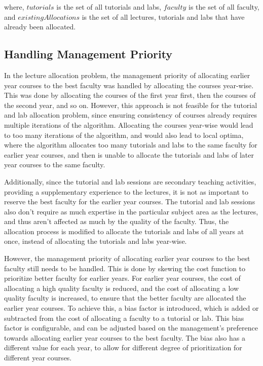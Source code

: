 where, $tutorials$ is the set of all tutorials and labs, $faculty$ is the set of all faculty, and $existingAllocations$ is the set of all lectures, tutorials and labs that have already been allocated.

\subsection{Handling Management Priority}

In the lecture allocation problem, the management priority of allocating earlier year courses to the best faculty was handled by allocating the courses year-wise. This was done by allocating the courses of the first year first, then the courses of the second year, and so on. However, this approach is not feasible for the tutorial and lab allocation problem, since ensuring consistency of courses already requires multiple iterations of the algorithm. Allocating the courses year-wise would lead to too many iterations of the algorithm, and would also lead to local optima, where the algorithm allocates too many tutorials and labs to the same faculty for earlier year courses, and then is unable to allocate the tutorials and labs of later year courses to the same faculty.

Additionally, since the tutorial and lab sessions are secondary teaching activities, providing a supplementary experience to the lectures, it is not as important to reserve the best faculty for the earlier year courses. The tutorial and lab sessions also don't require as much expertise in the particular subject area as the lectures, and thus aren't affected as much by the quality of the faculty. Thus, the allocation process is modified to allocate the tutorials and labs of all years at once, instead of allocating the tutorials and labs year-wise.

However, the management priority of allocating earlier year courses to the best faculty still needs to be handled. This is done by skewing the cost function to prioritize better faculty for earlier years. For earlier year courses, the cost of allocating a high quality faculty is reduced, and the cost of allocating a low quality faculty is increased, to ensure that the better faculty are allocated the earlier year courses. To achieve this, a bias factor is introduced, which is added or subtracted from the cost of allocating a faculty to a tutorial or lab. This bias factor is configurable, and can be adjusted based on the management's preference towards allocating earlier year courses to the best faculty. The bias also has a different value for each year, to allow for different degree of prioritization for different year courses.

